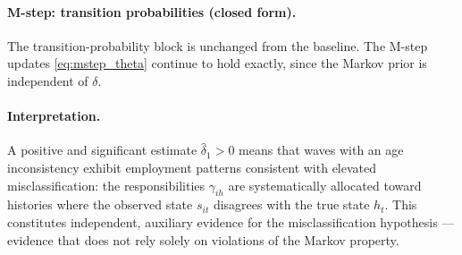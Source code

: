 \paragraph{M-step: transition probabilities (closed form).}
The transition-probability block is unchanged from the baseline. The
M-step updates \eqref{eq:mstep_theta} continue to hold exactly, since
the Markov prior is independent of \(\delta\).

\paragraph{Interpretation.}
A positive and significant estimate \(\hat\delta_1 > 0\) means that
waves with an age inconsistency exhibit employment patterns consistent
with elevated misclassification: the responsibilities \(\gamma_{ih}\)
are systematically allocated toward histories where the observed state
\(s_{it}\) disagrees with the true state \(h_t\). This constitutes
independent, auxiliary evidence for the misclassification hypothesis
--- evidence that does not rely solely on violations of the Markov
property.
